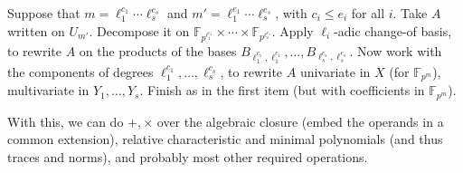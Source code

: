 \documentclass[12pt]{article}
\def\F {\ensuremath{\mathbb{F}}}
\begin{document}
\begin{itemize}
  Suppose that $m = \ell_1^{c_1} \cdots \ell_s^{c_s}$ and $m' =
  \ell_1^{e_1} \cdots \ell_s^{e_s}$, with $c_i \le e_i$ for all $i$.
  Take $A$ written on $U_{m'}$. Decompose it on $\F_{p^{\ell_1^{e_1}}}
  \times \cdots \times \F_{p^{\ell_s^{e_s}}}$. Apply $\ell_i$-adic
  change-of basis, to rewrite $A$ on the products of the bases
  $B_{\ell_1^{c_1},\ell_1^{e_1}},\dots,B_{\ell_s^{c_s},\ell_s^{e_s}}$.
  Now work with the components of degrees $\ell_1^{c_1},\dots,\ell_s^{c_s}$,
  to rewrite $A$ univariate in $X$ (for $\F_{p^m}$), multivariate 
  in $Y_1,\dots,Y_s$. Finish as in the first item (but with coefficients in
  $\F_{p^m}$).
\end{itemize}

With this, we can do $+,\times$ over the algebraic closure (embed the
operands in a common extension), relative characteristic and minimal
polynomials (and thus traces and norms), and probably most other
required operations.




 
\end{document}
